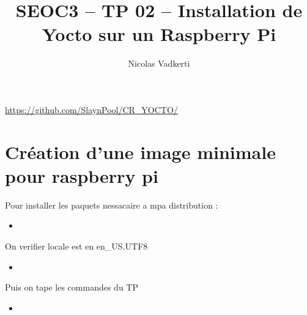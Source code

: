 \documentclass[10pt,a4paper]{article}
\title{SEOC3 – TP 02 – Installation de Yocto sur un Raspberry Pi}
\author{Nicolas Vadkerti}
\newcommand{\insertcode}[2]{\begin{itemize}\item[]\end{itemize}}
\begin{document}
\maketitle


\url{https://github.com/SlaynPool/CR_YOCTO/}


\section{Création d’une image minimale pour raspberry pi }
Pour installer les paquets nessacaire a mpa distribution :
\insertcode{commande/1.txt}{Installation des paquets pour ma distribution}
 
On verifier locale est en en\_US.UTF8


\insertcode{commande/2.txt}{Mes Locale}
Puis on tape les commandes du TP 

\insertcode{commande/3.txt}{On tape les commandes}
\end{document}
